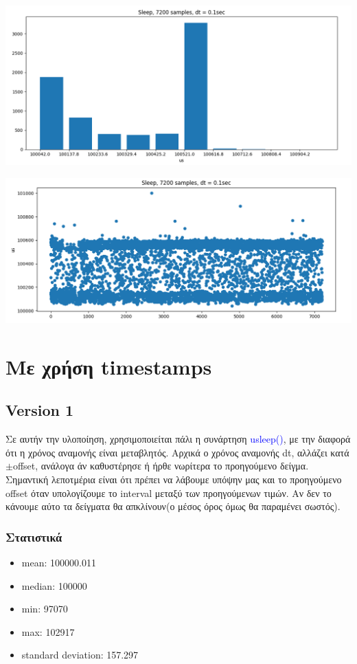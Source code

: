 \documentclass[12pt,a4paper]{article}
\begin{document}
\includegraphics[scale=0.55]{sleep_hist}

\includegraphics[scale=0.55]{sleep_sctr}


\section{Με χρήση timestamps}

\subsection*{Version 1}
Σε αυτήν την υλοποίηση, χρησιμοποιείται πάλι η συνάρτηση \textcolor{blue}{usleep()}, με την διαφορά ότι η χρόνος αναμονής είναι μεταβλητός.
Αρχικά ο χρόνος αναμονής dt, αλλάζει κατά $\pm$offset, ανάλογα άν καθυστέρησε ή ήρθε νωρίτερα το προηγούμενο δείγμα. Σημαντική λεποτμέρια είναι ότι πρέπει να λάβουμε υπόψην μας και το προηγούμενο offset όταν υπολογίζουμε το interval μεταξύ των προηγούμενων τιμών. Αν δεν το κάνουμε αύτο τα δείγματα θα απκλίνουν(ο μέσος όρος όμως θα παραμένει σωστός).


\subsubsection*{Στατιστικά}

\begin{itemize}
\item mean: 100000.011
\item median: 100000
\item min: 97070
\item max: 102917
\item standard deviation:  157.297
\end{itemize}
\end{document}

